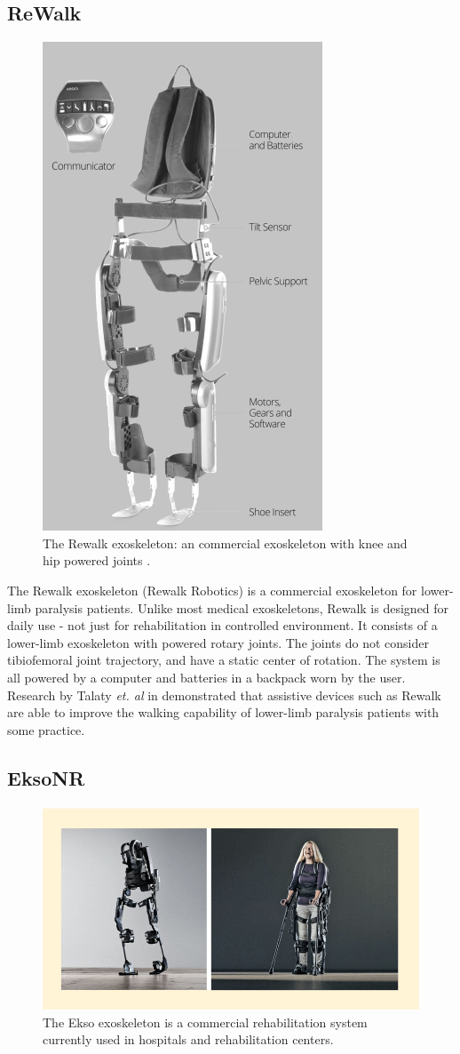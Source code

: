 \subsection{ReWalk}
\begin{figure}[H]
    \centering
    \includegraphics[width=0.4\linewidth]{Figures/Background/OtherExos/ReWalk.png}
    \caption{The Rewalk exoskeleton: an commercial exoskeleton with knee and hip powered joints \cite{ExoRewalk}.}
    \label{fig:RewalkExo}
\end{figure}

The {Rewalk\texttrademark} exoskeleton (Rewalk Robotics) is a commercial exoskeleton for lower-limb paralysis patients. Unlike most medical exoskeletons, Rewalk is designed for daily use - not just for rehabilitation in controlled environment. It consists of a lower-limb exoskeleton with powered rotary joints. The joints do not consider tibiofemoral joint trajectory, and have a static center of rotation. The system is all powered by a computer and batteries in a backpack worn by the user. Research by Talaty \textit{et. al} in \cite{ExoRewalk} demonstrated that assistive devices such as Rewalk are able to improve the walking capability of lower-limb paralysis patients with some practice. 

\subsection{EksoNR}
\begin{figure}[H]
    \centering
    \includegraphics[width=0.9\linewidth]{Figures/Background/OtherExos/EKSO.png}
    \caption{The Ekso exoskeleton is a commercial rehabilitation system currently used in hospitals and rehabilitation centers.}
    \label{fig:EksoExo}
\end{figure}

